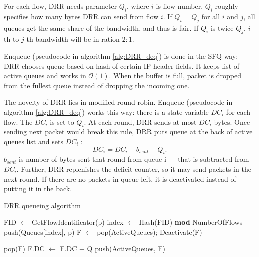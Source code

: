 For each flow, DRR needs parameter $Q_i$, where $i$ is flow number. $Q_i$ roughly specifies how many bytes DRR can send from flow $i$. If $Q_i = Q_j$ for all $i$ and $j$, all queues get the same share of the bandwidth, and thus is fair. If $Q_i$ is twice $Q_j$, $i$-th to $j$-th bandwidth will be in ration $2:1$.

Enqueue (pseudocode in algorithm \autoref{alg:DRR_deq}) is done in the SFQ-way: DRR chooses queue based on hash of certain IP header fields. It keeps list of active queues and works in $\mathcal{O}(1)$. When the buffer is full, packet is dropped from the fullest queue instead of dropping the incoming one.

The novelty of DRR lies in modified round-robin. Enqueue (pseudocode in algorithm \autoref{alg:DRR_deq}) works this way: there is a state variable $DC_i$ for each flow. The $DC_i$ is set to $Q_i$. At each round, DRR sends at most $DC_i$ bytes. Once sending next packet would break this rule, DRR puts queue  at the back of active queues list and sets $DC_i$ :
\[
  DC_i = DC_i - b_{sent} + Q_i.
\]
$b_{sent}$ is number of bytes sent that round from queue i --- that is subtracted from $DC_i$. Further, DRR replenishes the deficit counter, so it may send packets in the next round. If there are no packets in queue left, it is deactivated instead of putting it in the back.

\begin{algorithm}[t]
	\caption{DRR queueing algorithm}
	\label{alg:DRR_deq}
	\begin{algorithmic}
		\State FID $\leftarrow$ GetFlowIdentificator(p)
		\State index $\leftarrow$ Hash(FID) \textbf{mod} NumberOfFlows
		\State push(Queues[index], p)
		\State \Return
	\EndFunction
			\State F $\leftarrow$ pop(ActiveQueues);
				\State Deactivate(F)
				
					\State \Return pop(F)
			\Else {}
				\State F.DC $\leftarrow$ F.DC + Q
				\State push(ActiveQueues, F)
			\EndIf
		\EndWhile
	\EndFunction
	\end{algorithmic}
\end{algorithm}

